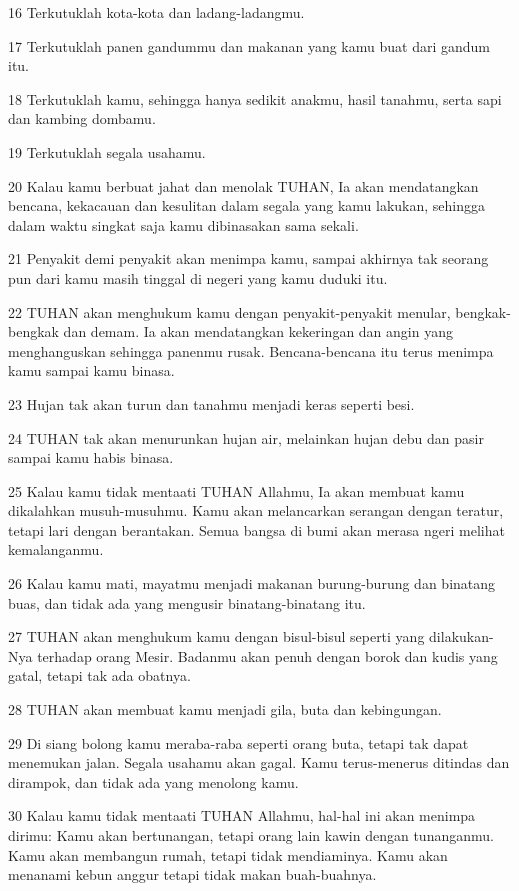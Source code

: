 \par 16 Terkutuklah kota-kota dan ladang-ladangmu.
\par 17 Terkutuklah panen gandummu dan makanan yang kamu buat dari gandum itu.
\par 18 Terkutuklah kamu, sehingga hanya sedikit anakmu, hasil tanahmu, serta sapi dan kambing dombamu.
\par 19 Terkutuklah segala usahamu.
\par 20 Kalau kamu berbuat jahat dan menolak TUHAN, Ia akan mendatangkan bencana, kekacauan dan kesulitan dalam segala yang kamu lakukan, sehingga dalam waktu singkat saja kamu dibinasakan sama sekali.
\par 21 Penyakit demi penyakit akan menimpa kamu, sampai akhirnya tak seorang pun dari kamu masih tinggal di negeri yang kamu duduki itu.
\par 22 TUHAN akan menghukum kamu dengan penyakit-penyakit menular, bengkak-bengkak dan demam. Ia akan mendatangkan kekeringan dan angin yang menghanguskan sehingga panenmu rusak. Bencana-bencana itu terus menimpa kamu sampai kamu binasa.
\par 23 Hujan tak akan turun dan tanahmu menjadi keras seperti besi.
\par 24 TUHAN tak akan menurunkan hujan air, melainkan hujan debu dan pasir sampai kamu habis binasa.
\par 25 Kalau kamu tidak mentaati TUHAN Allahmu, Ia akan membuat kamu dikalahkan musuh-musuhmu. Kamu akan melancarkan serangan dengan teratur, tetapi lari dengan berantakan. Semua bangsa di bumi akan merasa ngeri melihat kemalanganmu.
\par 26 Kalau kamu mati, mayatmu menjadi makanan burung-burung dan binatang buas, dan tidak ada yang mengusir binatang-binatang itu.
\par 27 TUHAN akan menghukum kamu dengan bisul-bisul seperti yang dilakukan-Nya terhadap orang Mesir. Badanmu akan penuh dengan borok dan kudis yang gatal, tetapi tak ada obatnya.
\par 28 TUHAN akan membuat kamu menjadi gila, buta dan kebingungan.
\par 29 Di siang bolong kamu meraba-raba seperti orang buta, tetapi tak dapat menemukan jalan. Segala usahamu akan gagal. Kamu terus-menerus ditindas dan dirampok, dan tidak ada yang menolong kamu.
\par 30 Kalau kamu tidak mentaati TUHAN Allahmu, hal-hal ini akan menimpa dirimu: Kamu akan bertunangan, tetapi orang lain kawin dengan tunanganmu. Kamu akan membangun rumah, tetapi tidak mendiaminya. Kamu akan menanami kebun anggur tetapi tidak makan buah-buahnya.

